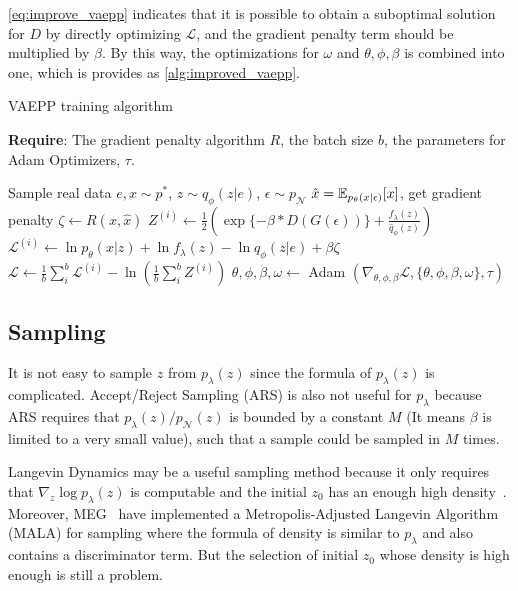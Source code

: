 \cref{eq:improve_vaepp} indicates that it is possible to obtain a suboptimal solution for $D$ by directly optimizing $\mathcal{L}$, and the gradient penalty term should be multiplied by $\beta$. By this way, the optimizations for $\omega$ and $\theta, \phi, \beta$ is combined into one, which is provides as \cref{alg:improved_vaepp}. 
\begin{algorithm}[tb]
\caption{VAEPP training algorithm}
\label{alg:improved_vaepp}
\textbf{Require}: The gradient penalty algorithm $R$, the batch size $b$, the parameters for Adam Optimizers, $\tau$. 

\begin{algorithmic}[1] %
\STATE Sample real data $e, x \sim p^*$, $z \sim q_\phi(z|e)$, $\epsilon \sim p_\mathcal{N}$
\STATE $\hat{x} = \operatorname{\mathbb{E}}_{p_\theta(x|\epsilon)}[x]$, get gradient penalty $\zeta \gets R(x, \hat{x})$ 
\STATE $Z^{(i)} \gets \frac{1}{2}(\exp\{-\beta * D(G(\epsilon))\} + \frac{f_\lambda(z)}{\hat{q}_\phi(z)})$
\STATE $\mathcal{L}^{(i)} \gets \ln p_\theta(x|z) + \ln f_\lambda(z) - \ln q_\phi(z|e) + \beta \zeta$
\ENDFOR
\STATE $\mathcal{L} \gets \frac{1}{b}\sum_{i}^b \mathcal{L}^{(i)} - \ln (\frac{1}{b}\sum_{i}^b Z^{(i)})$
\STATE $\theta, \phi, \beta, \omega \gets $ Adam $(\nabla_{\theta, \phi, \beta} \mathcal{L}, \{\theta, \phi, \beta, \omega\}, \tau)$
\ENDWHILE
\end{algorithmic}
\end{algorithm}

\subsection{Sampling}
It is not easy to sample $z$ from $p_\lambda(z)$ since the formula of $p_\lambda(z)$ is complicated. Accept/Reject Sampling (ARS) is also not useful for $p_\lambda$ because ARS requires that $p_\lambda(z) / p_\mathcal{N}(z)$ is bounded by a constant $M$ (It means $\beta$ is limited to a very small value), such that a sample could be sampled in $M$ times. 

Langevin Dynamics may be a useful sampling method because it only requires that $\nabla_z \log p_\lambda(z)$ is computable and the initial $z_0$ has an enough high density~\cite{song2019generative}. Moreover, MEG~\cite{kumar2019maximum} have implemented a Metropolis-Adjusted Langevin Algorithm (MALA) for sampling where the formula of density is similar to $p_\lambda$ and also contains a discriminator term. But the selection of initial $z_0$ whose density is high enough is still a problem. 

